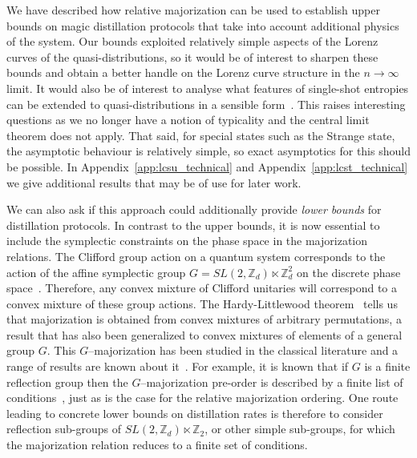\documentclass[pra,
aps,
twocolumn,
superscriptaddress,
groupedaddress,
nofootinbib,
reprint
]{revtex4-1}
\begin{document}
We have described how relative majorization can be used to establish upper bounds on magic distillation protocols that take into account additional physics of the system. Our bounds exploited relatively simple aspects of the Lorenz curves of the quasi-distributions, so it would be of interest to sharpen these bounds and obtain a better handle on the Lorenz curve structure in the $n\rightarrow \infty$ limit. It would also be of interest to analyse what features of single-shot entropies can be extended to quasi-distributions in a sensible form~\cite{renner_phd, tomamichel2013}. This raises interesting questions as we no longer have a notion of typicality and the central limit theorem does not apply. That said, for special states such as the Strange state, the asymptotic behaviour is relatively simple, so exact asymptotics for this should be possible. In Appendix~\ref{app:lcsu_technical} and Appendix~\ref{app:lcst_technical} we give additional results that may be of use for later work.

We can also ask if this approach could additionally provide \emph{lower bounds} for distillation protocols. In contrast to the upper bounds, it is now essential to include the symplectic constraints on the phase space in the majorization relations. The Clifford group action on a quantum system corresponds to the action of the affine symplectic group $G=SL(2,\mathbb{Z}_d) \ltimes \mathbb{Z}_d^2$ on the discrete phase space~\cite{Appleby_2005, Bengtsson_2006}. Therefore, any convex mixture of Clifford unitaries will correspond to a convex mixture of these group actions. The Hardy-Littlewood theorem~\cite{hardy_1952} tells us that majorization is obtained from convex mixtures of arbitrary permutations, a result that has also been generalized to convex mixtures of elements of a general group $G$. This $G$--majorization has been studied in the classical literature and a range of results are known about it~\cite{giovagnoli_1985, steerneman_1990, eaton_1977}. For example, it is known that if $G$ is a finite reflection group then the $G$--majorization pre-order is described by a finite list of conditions~\cite{giovagnoli_1985}, just as is the case for the relative majorization ordering. One route leading to concrete lower bounds on distillation rates is therefore to consider reflection sub-groups of $SL(2,\mathbb{Z}_d) \ltimes \mathbb{Z}_2$, or other simple sub-groups, for which the majorization relation reduces to a finite set of conditions.
  
\end{document}
